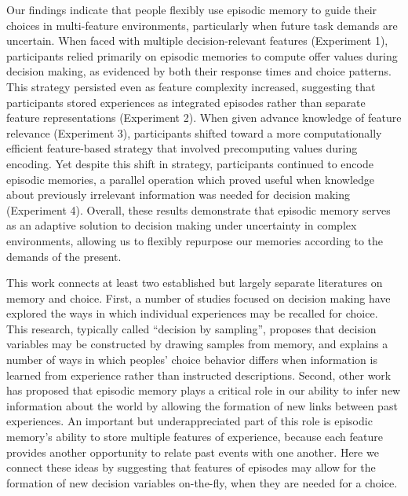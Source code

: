 \documentclass[10pt,letterpaper]{article}
\begin{document}
Our findings indicate that people flexibly use episodic memory to guide their choices in multi-feature environments, particularly when future task demands are uncertain. When faced with multiple decision-relevant features (Experiment 1), participants relied primarily on episodic memories to compute offer values during decision making, as evidenced by both their response times and choice patterns. This strategy persisted even as feature complexity increased, suggesting that participants stored experiences as integrated episodes rather than separate feature representations (Experiment 2). When given advance knowledge of feature relevance (Experiment 3), participants shifted toward a more computationally efficient feature-based strategy that involved precomputing values during encoding. Yet despite this shift in strategy, participants continued to encode episodic memories, a parallel operation which proved useful when knowledge about previously irrelevant information was needed for decision making (Experiment 4). Overall, these results demonstrate that episodic memory serves as an adaptive solution to decision making under uncertainty in complex environments, allowing us to flexibly repurpose our memories according to the demands of the present.

This work connects at least two established but largely separate literatures on memory and choice. First, a number of studies focused on decision making have explored the ways in which individual experiences may be recalled for choice\cite{STEWART20061, bieleLearningRiskAttitude2009,plonskyRelianceSmallSamples2015, shadlenDecisionMakingSequential2016, wangMixingMemoryDesire2022}. This research, typically called ``decision by sampling'', proposes that decision variables may be constructed by drawing samples from memory, and explains a number of ways in which peoples' choice behavior differs when information is learned from experience rather than instructed descriptions\cite{hertwigDescriptionExperienceGap2009}. Second, other work has proposed that episodic memory plays a critical role in our ability to infer new information about the world by allowing the formation of new links between past experiences\cite{schlichtingHippocampusMemoryIntegration2017,whittingtonTolmanEichenbaumMachineUnifying2020,bidermanWhatAreMemories2020}. An important but underappreciated part of this role is episodic memory's ability to store multiple features of experience, because each feature provides another opportunity to relate past events with one another. Here we connect these ideas by suggesting that features of episodes may allow for the formation of new decision variables on-the-fly, when they are needed for a choice.
\end{document}
